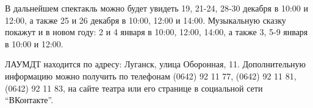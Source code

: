 В дальнейшем спектакль можно будет увидеть 19, 21-24, 28-30 декабря в 10:00 и
12:00, а также 25 и 26 декабря в 10:00, 12:00 и 14:00. Музыкальную сказку
покажут и в новом году: 2 и 4 января в 10:00, 12:00, 14:00, а также 3, 5-9
января в 10:00 и 12:00.

ЛАУМДТ находится по адресу: Луганск, улица Оборонная, 11. Дополнительную
информацию можно получить по телефонам (0642) 92 11 77, (0642) 92 11 81, (0642)
92 11 83, на сайте театра или его странице в социальной сети \enquote{ВКонтакте}.
